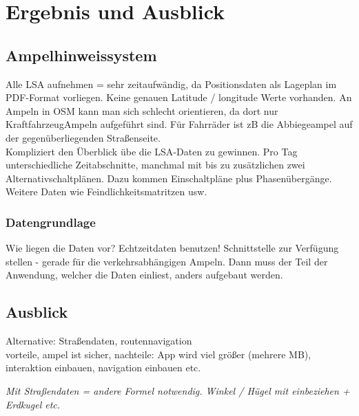 \chapter{\label{chap:fazit}Ergebnis und Ausblick}
\section{Ampelhinweissystem}
Alle LSA aufnehmen = sehr zeitaufwändig, da Positionsdaten als Lageplan im \gls{PDF}-Format vorliegen. Keine genauen Latitude / longitude Werte vorhanden. An Ampeln in OSM kann man sich schlecht orientieren, da dort nur KraftfahrzeugAmpeln aufgeführt sind. Für Fahrräder ist zB die Abbiegeampel auf der gegenüberliegenden Straßenseite. \\
Kompliziert den Überblick übe die \gls{LSA}-Daten zu gewinnen. Pro Tag unterschiedliche Zeitabschnitte, manchmal mit bis zu zusätzlichen zwei Alternativschaltplänen. Dazu kommen Einschaltpläne plus Phasenübergänge. Weitere Daten wie Feindlichkeitsmatritzen usw.
\subsection{Datengrundlage}
Wie liegen die Daten vor? Echtzeitdaten benutzen! 
Schnittstelle zur Verfügung stellen - gerade für die verkehrsabhängigen Ampeln. Dann muss der Teil der Anwendung, welcher die Daten einliest, anders aufgebaut werden.

\section{Ausblick}

Alternative: Straßendaten, routennavigation\\ vorteile, ampel ist sicher, nachteile:
App wird viel größer (mehrere MB),  interaktion einbauen, navigation einbauen etc. 

\textit{Mit Straßendaten = andere Formel notwendig. Winkel / Hügel mit einbeziehen + Erdkugel etc.}
